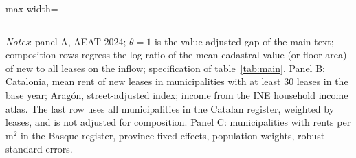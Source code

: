 \begin{table}[!htbp]
\begin{adjustbox}{max width=\linewidth}
\begin{tabular}{lcccc}
\bottomrule\end{tabular}\end{adjustbox}
\begin{minipage}{0.97\linewidth}\footnotesize\vspace{4pt}
\textit{Notes}: panel A, AEAT 2024; $\theta=1$ is the value-adjusted gap of the main text; composition rows regress the log ratio of the mean cadastral value (or floor area) of new to all leases on the inflow; specification of table~\ref{tab:main}. Panel B: Catalonia, mean rent of new leases in municipalities with at least 30 leases in the base year; Aragón, street-adjusted index; income from the INE household income atlas. The last row uses all municipalities in the Catalan register, weighted by leases, and is not adjusted for composition. Panel C: municipalities with rents per m$^2$ in the Basque register, province fixed effects, population weights, robust standard errors.
\end{minipage}\end{table}